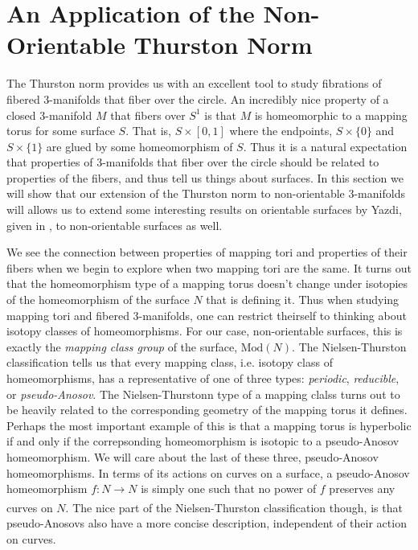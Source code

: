 \section{An Application of the Non-Orientable Thurston Norm}


The Thurston norm provides us with an excellent tool to study fibrations of fibered 3-manifolds that fiber over the circle. An incredibly nice property of a closed 3-manifold $M$ that fibers over $S^1$ is that $M$ is homeomorphic to a mapping torus for some surface $S$. That is, $S \times [0,1]$ where the endpoints, $S \times \{0\}$ and $S \times \{1\}$ are glued by some homeomorphism of $S$. Thus it is a natural expectation that properties of 3-manifolds that fiber over the circle should be related to properties of the fibers, and thus tell us things about surfaces. In this section we will show that our extension of the Thurston norm to non-orientable 3-manifolds will allows us to extend some interesting results on orientable surfaces by Yazdi, given in \cite{yazdi2018pseudo}, to non-orientable surfaces as well.

We see the connection between properties of mapping tori and properties of their fibers when we begin to explore when two mapping tori are the same. It turns out that the homeomorphism type of a mapping torus doesn't change under isotopies of the homeomorphism of the surface $N$ that is defining it. Thus when studying mapping tori and fibered 3-manifolds, one can restrict theirself to thinking about isotopy classes of homeomorphisms. For our case, non-orientable surfaces, this is exactly the \textit{mapping class group} of the surface, $\text{Mod}(N)$. The Nielsen-Thurston classification tells us that every mapping class, i.e. isotopy class of homeomorphisms, has a representative of one of three types: \textit{periodic}, \textit{reducible}, or \textit{pseudo-Anosov}. The Nielsen-Thurstonn type of a mapping clalss turns out to be heavily related to the corresponding geometry of the mapping torus it defines. Perhaps the most important example of this is that a mapping torus is hyperbolic if and only if the correpsonding homeomorphism is isotopic to a pseudo-Anosov homeomorphism. We will care about the last of these three, pseudo-Anosov homeomorphisms. In terms of its actions on curves on a surface, a pseudo-Anosov homeomorphism $f: N \xrightarrow[]{} N$ is simply one such that no power of $f$ preserves any curves on $N$. The nice part of the Nielsen-Thurston classification though, is that pseudo-Anosovs also have a more concise description, independent of their action on curves.

